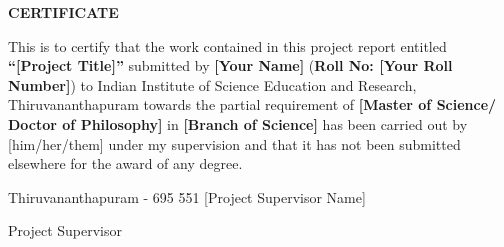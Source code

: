 \begin{center}
{\large{\bf{CERTIFICATE}}}
\end{center}


\noindent
This is to certify that the work contained in this project report entitled \textbf{``[Project Title]''}  submitted by \textbf{[Your Name]} (\textbf{Roll No: [Your Roll Number]}) to Indian Institute of Science Education and Research, Thiruvananthapuram towards the partial requirement of {\bf [Master of Science/ Doctor of Philosophy]} in \textbf{[Branch of Science]} has been carried out by [him/her/them] under my supervision and that it has not been submitted elsewhere for the award of any degree.


\vspace{4cm} %

\noindent Thiruvananthapuram - 695 551 \hfill [Project Supervisor Name]

 \hfill Project Supervisor

\clearpage

